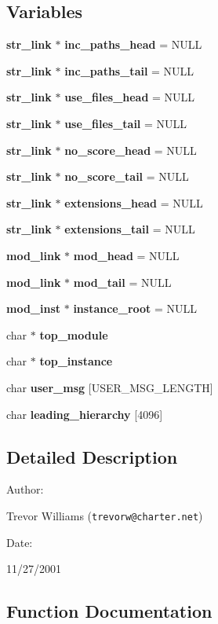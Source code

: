 \subsection*{Variables}
\begin{CompactItemize}
\item 
{\bf str\_\-link} $\ast$ {\bf inc\_\-paths\_\-head} = NULL
\item 
{\bf str\_\-link} $\ast$ {\bf inc\_\-paths\_\-tail} = NULL
\item 
{\bf str\_\-link} $\ast$ {\bf use\_\-files\_\-head} = NULL
\item 
{\bf str\_\-link} $\ast$ {\bf use\_\-files\_\-tail} = NULL
\item 
{\bf str\_\-link} $\ast$ {\bf no\_\-score\_\-head} = NULL
\item 
{\bf str\_\-link} $\ast$ {\bf no\_\-score\_\-tail} = NULL
\item 
{\bf str\_\-link} $\ast$ {\bf extensions\_\-head} = NULL
\item 
{\bf str\_\-link} $\ast$ {\bf extensions\_\-tail} = NULL
\item 
{\bf mod\_\-link} $\ast$ {\bf mod\_\-head} = NULL
\item 
{\bf mod\_\-link} $\ast$ {\bf mod\_\-tail} = NULL
\item 
{\bf mod\_\-inst} $\ast$ {\bf instance\_\-root} = NULL
\item 
char $\ast$ {\bf top\_\-module}
\item 
char $\ast$ {\bf top\_\-instance}
\item 
char {\bf user\_\-msg} [USER\_\-MSG\_\-LENGTH]
\item 
char {\bf leading\_\-hierarchy} [4096]
\end{CompactItemize}


\subsection{Detailed Description}


\begin{Desc}
\item[Author: ]\par
Trevor Williams ({\tt trevorw@charter.net}) \end{Desc}
\begin{Desc}
\item[Date: ]\par
11/27/2001\end{Desc}


\subsection{Function Documentation}
